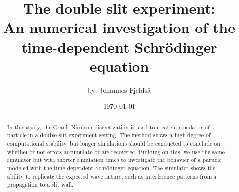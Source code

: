\documentclass[english,notitlepage,reprint,nofootinbib]{revtex4-2}  %
\begin{document}
\title{
The double slit experiment:\\
An numerical investigation of the time-dependent Schr\"odinger equation
}      %
\author{by: Johannes Fjeldså}          %
\date{\today}                             %
\noaffiliation                            %

\begin{abstract}
\noindent In this study, the Crank-Nicolson discretization is used to create a simulator of a particle in a double-slit experiment setting. The method shows a high degree of computational stability, but longer simulations should be conducted to conclude on whether or not errors accumulate or are recovered. Building on this, we use the same simulator but with shorter simulation times to investigate the behavior of a particle modeled with the time-dependent Schr\"odinger equation. The simulator shows the ability to replicate the expected wave nature, such as interference patterns from a propagation to a slit wall.
    \end{abstract}
\maketitle























\newpage
\onecolumngrid
% 



\newpage

\end{document}
